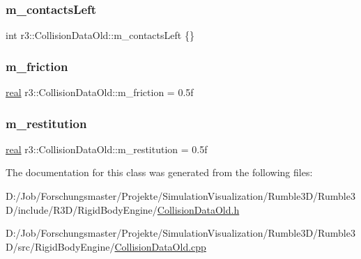 \mbox{\label{classr3_1_1_collision_data_old_ad18fd7d0136d1e6d80c7c5340652a08d}} 
\subsubsection{\texorpdfstring{m\+\_\+contacts\+Left}{m\_contactsLeft}}
{\footnotesize\ttfamily int r3\+::\+Collision\+Data\+Old\+::m\+\_\+contacts\+Left \{\}\hspace{0.3cm}{\ttfamily [protected]}}

\mbox{\label{classr3_1_1_collision_data_old_a598bcf57a27bd4ed84eab8f64b334c12}} 
\subsubsection{\texorpdfstring{m\+\_\+friction}{m\_friction}}
{\footnotesize\ttfamily \mbox{\hyperlink{namespacer3_ab2016b3e3f743fb735afce242f0dc1eb}{real}} r3\+::\+Collision\+Data\+Old\+::m\+\_\+friction = 0.\+5f\hspace{0.3cm}{\ttfamily [protected]}}

\mbox{\label{classr3_1_1_collision_data_old_ae4fb8abfc80fdf2637e89bd2ef621aac}} 
\subsubsection{\texorpdfstring{m\+\_\+restitution}{m\_restitution}}
{\footnotesize\ttfamily \mbox{\hyperlink{namespacer3_ab2016b3e3f743fb735afce242f0dc1eb}{real}} r3\+::\+Collision\+Data\+Old\+::m\+\_\+restitution = 0.\+5f\hspace{0.3cm}{\ttfamily [protected]}}



The documentation for this class was generated from the following files\+:\begin{DoxyCompactItemize}
\item 
D\+:/\+Job/\+Forschungsmaster/\+Projekte/\+Simulation\+Visualization/\+Rumble3\+D/\+Rumble3\+D/include/\+R3\+D/\+Rigid\+Body\+Engine/\mbox{\hyperlink{_collision_data_old_8h}{Collision\+Data\+Old.\+h}}\item 
D\+:/\+Job/\+Forschungsmaster/\+Projekte/\+Simulation\+Visualization/\+Rumble3\+D/\+Rumble3\+D/src/\+Rigid\+Body\+Engine/\mbox{\hyperlink{_collision_data_old_8cpp}{Collision\+Data\+Old.\+cpp}}\end{DoxyCompactItemize}

